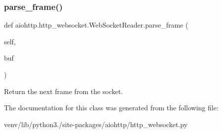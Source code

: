 \subsubsection{\texorpdfstring{parse\+\_\+frame()}{parse\_frame()}}
{\footnotesize\ttfamily def aiohttp.\+http\+\_\+websocket.\+Web\+Socket\+Reader.\+parse\+\_\+frame (\begin{DoxyParamCaption}\item[{}]{self,  }\item[{}]{buf }\end{DoxyParamCaption})}

\begin{DoxyVerb}Return the next frame from the socket.\end{DoxyVerb}
 

The documentation for this class was generated from the following file\+:\begin{DoxyCompactItemize}
\item 
venv/lib/python3./site-\/packages/aiohttp/http\+\_\+websocket.\+py\end{DoxyCompactItemize}
